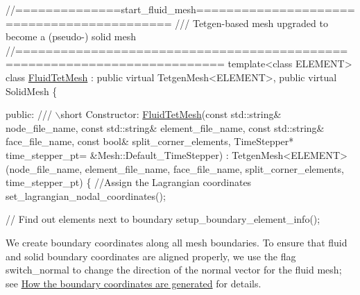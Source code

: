 \begin{DoxyCodeInclude}
\textcolor{comment}{//==============start\_fluid\_mesh===========================================}
\textcolor{comment}{/// Tetgen-based mesh upgraded to become a (pseudo-) solid mesh}
\textcolor{comment}{}\textcolor{comment}{//=========================================================================}
\textcolor{keyword}{template}<\textcolor{keyword}{class} ELEMENT>
\textcolor{keyword}{class }\hyperlink{classFluidTetMesh}{FluidTetMesh} : \textcolor{keyword}{public} \textcolor{keyword}{virtual} TetgenMesh<ELEMENT>,
                     \textcolor{keyword}{public} \textcolor{keyword}{virtual} SolidMesh 
\{
 
\textcolor{keyword}{public}:
 \textcolor{comment}{}
\textcolor{comment}{ /// \(\backslash\)short Constructor: }
\textcolor{comment}{} \hyperlink{classFluidTetMesh_a5f8ea145d68623198abc97209a0491a6}{FluidTetMesh}(\textcolor{keyword}{const} std::string& node\_file\_name,
              \textcolor{keyword}{const} std::string& element\_file\_name,
              \textcolor{keyword}{const} std::string& face\_file\_name,
              \textcolor{keyword}{const} \textcolor{keywordtype}{bool}& split\_corner\_elements,
              TimeStepper* time\_stepper\_pt=
              &Mesh::Default\_TimeStepper) : 
  TetgenMesh<ELEMENT>(node\_file\_name, element\_file\_name,
                      face\_file\_name, split\_corner\_elements, 
                      time\_stepper\_pt)
  \{
   \textcolor{comment}{//Assign the Lagrangian coordinates}
   set\_lagrangian\_nodal\_coordinates();

   \textcolor{comment}{// Find out elements next to boundary}
   setup\_boundary\_element\_info();

\end{DoxyCodeInclude}


We create boundary coordinates along all mesh boundaries. To ensure that fluid and solid boundary coordinates are aligned properly, we use the flag {\ttfamily switch\+\_\+normal} to change the direction of the normal vector for the fluid mesh; see \hyperlink{index_boundary_coord}{How the boundary coordinates are generated} for details.


